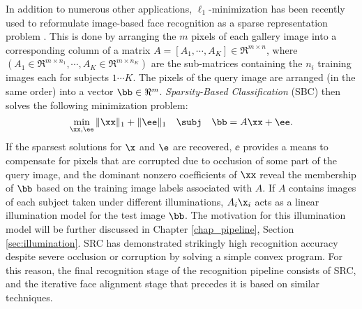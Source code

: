 In addition to numerous other applications, $\ell_1$-minimization has been 
recently used to reformulate image-based face recognition as a sparse representation problem
\cite{WrightJ2009-PAMI}.  This is done by arranging the $m$ pixels of each gallery image into a corresponding
column of a matrix 
$A = [A_1, \cdots, A_K]\in\Re^{m\times n}$,
where 
$(A_1\in\Re^{m\times n_1}, \cdots, A_K\in\Re^{m\times n_K})$
are the sub-matrices containing 
the $n_i$ training images each for subjects $1 \cdots K$.
The pixels of the query image are arranged (in the same order) into a vector $\bb\in\Re^m$. 
\emph{Sparsity-Based
Classification} (SBC) then solves the following minimization problem:
\begin{equation}
\min_{\xx, \ee} \| \xx \|_1 + \|\ee\|_1 \quad \subj \quad \bb = A \xx + \ee.
\label{eq:l1min_denoise}
\end{equation}
If the sparsest solutions for $\x$ and $\e$ are recovered, $\ee$ provides a
means to compensate for pixels that are corrupted due to occlusion of some part of the query
image, and the dominant nonzero coefficients of $\xx$ reveal the membership of
$\bb$ based on the training image labels associated with $A$. 
If $A$ contains images of each subject taken under different illuminations, 
$A_i\x_i$ acts as a linear illumination model for the test image $\bb$.  The motivation
for this illumination model will be further discussed in Chapter \ref{chap_pipeline}, Section \ref{sec:illumination}.
SRC has demonstrated strikingly high recognition accuracy
despite severe occlusion or corruption by solving a simple convex program.  For
this reason, the final recognition stage of the recognition pipeline consists of
SRC, and the iterative face alignment stage that precedes it is based on
similar techniques.

